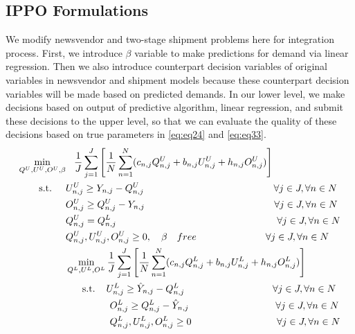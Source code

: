 \documentclass[12pt]{article}
\begin{document}
\subsection{IPPO Formulations}
We modify newsvendor and two-stage shipment problems here for integration process. First, we introduce $\beta$ variable to make predictions for demand via linear regression. Then we also introduce counterpart decision variables of original variables in newsvendor and shipment models because these counterpart decision variables will be made based on predicted demands. In our lower level, we make decisions based on output of predictive algorithm, linear regression, and submit these decisions to the upper level, so that we can evaluate the quality of these decisions based on true parameters in \ref{eq:eq24} and \ref{eq:eq33}.\\
\begin{subequations}
\begin{flalign}
\min\limits_{Q^U,U^U,O^U,\beta} & \hspace{3 mm} \frac{1}{J}\sum\limits_{j=1}^{J}\left[\frac{1}{N}\sum\limits_{n=1}^{N}(c_{n,j}Q_{n,j}^{U}+b_{n,j}U_{n,j}^U+h_{n,j}O_{n,j}^U)\right] \label{eq:eq21}\\
\textrm{s.t.} \hspace{5 mm} & U_{n,j}^U \geq Y_{n,j}-Q_{n,j}^U \hspace{47.1 mm} \forall j \in J, \forall n \in N \label{eq:eq22}\\
& O_{n,j}^U \geq Q_{n,j}^U-Y_{n,j} \hspace{47 mm} \forall j \in J, \forall n \in N \label{eq:eq23}\\
& Q^U_{n,j}= Q^L_{n,j}   \hspace{58.3 mm} \forall j \in J,\forall n \in N \label{eq:eq24}\\
& Q_{n,j}^U, U_{n,j}^U,O_{n,j}^U\geq 0, \quad \beta \quad free \hspace{25.1 mm} \forall j \in J, \forall n \in N \label{eq:eq25}\\
&\min\limits_{Q^L,U^L,O^L}  \frac{1}{J}\sum\limits_{j=1}^{J}\left[ \frac{1}{N}\sum\limits_{n=1}^{N}(c_{n,j}Q_{n,j}^{L}+b_{n,j}U_{n,j}^L+h_{n,j}O_{n,j}^L)\right] \label{eq:eq26}\\
&\hspace{6 mm} \textrm{s.t.} \hspace{4 mm} U_{n,j}^L \geq \hat{Y}_{n,j}-Q_{n,j}^L \hspace{32 mm} \forall j \in J, \forall n \in N \label{eq:eq27}\\
&\hspace{16 mm} O_{n,j}^L \geq Q_{n,j}^L-\hat{Y}_{n,j} \hspace{31.5 mm} \forall j \in J, \forall n \in N \label{eq:eq28}\\
&\hspace{16 mm} Q_{n,j}^L, U_{n,j}^L,O_{n,j}^L\geq 0 \hspace{31 mm} \forall j \in J,\forall n \in N \label{eq:eq29}
\end{flalign}
\end{subequations}
\end{document}
